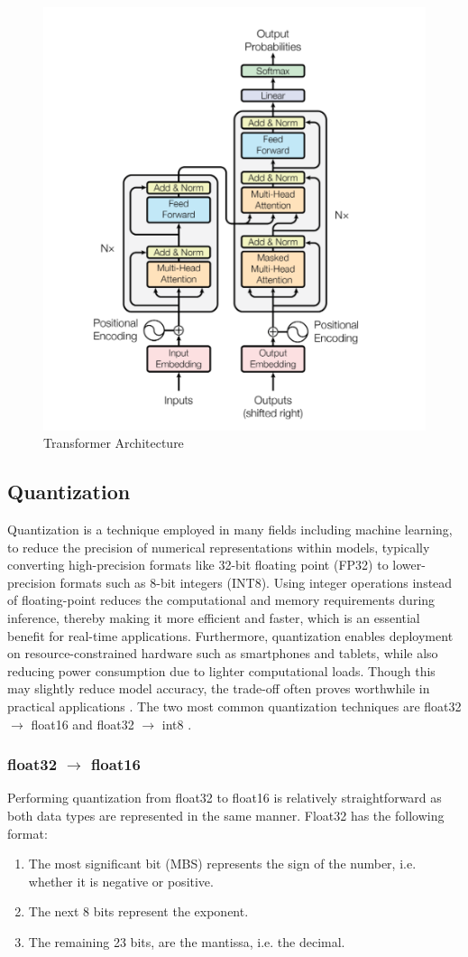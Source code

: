 \documentclass[licencjacka,en]{pracamgr}
\begin{document}
\begin{figure}
    \centering
    \includegraphics[width=0.5\linewidth]{bachelor_images/transformer_arch.png}
    \caption{Transformer Architecture \cite{attention}}
    \label{fig:transformers_fig}
\end{figure}

\subsection{Quantization}
Quantization is a technique employed in many fields including machine learning, to reduce the precision of numerical representations within models, typically converting high-precision formats like 32-bit floating point (FP32) to lower-precision formats such as 8-bit integers (INT8). Using integer operations instead of floating-point reduces the computational and memory requirements during inference, thereby making it more efficient and faster, which is an essential benefit for real-time applications. Furthermore, quantization enables deployment on resource-constrained hardware such as smartphones and tablets, while also reducing power consumption due to lighter computational loads. Though this may slightly reduce model accuracy, the trade-off often proves worthwhile in practical applications \cite{ibm_quantization}.
The two most common quantization techniques are float32 $\rightarrow$ float16 and float32 $\rightarrow$ int8 \cite{quant_hf}.
\subsubsection{float32 $\rightarrow$ float16}
Performing quantization from float32 to float16 is relatively straightforward as both data types are represented in the same manner. Float32 has the following format: 
\begin{enumerate}
	\item The most significant bit (MBS) represents the sign of the number, i.e. whether it is negative or positive.
	\item The next 8 bits represent the exponent.
	\item The remaining 23 bits, are the mantissa, i.e. the decimal.
\end{enumerate}
\end{document}
